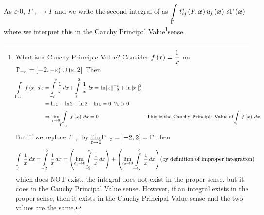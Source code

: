 As $\varepsilon^{\downarrow} 0$, $\Gamma_{-\varepsilon}\rightarrow \Gamma$ and
we write the second integral of  as $\gint{\Gamma}{}
{\fnof{t_{ij}^{*}}{P,\vect{x}}
  \fnof{u_{j}}{\vect{x}}}{\fnof{\Gamma}{\vect{x}}}$ where we interpret this in
the Cauchy Principal Value\footnote{What is a Cauchy Principle Value? 
                \newline Consider $ f\left( x \right)  = \dfrac{1}{x}$ on
    $\Gamma_{-\varepsilon} = \left[ -2,-\varepsilon) \cup (\varepsilon,2 \right]$
   \newline Then
      \begin{alignat*}{2}
          \displaystyle\int\limits_{\Gamma_{-\varepsilon}}^{} \, f\left( x \right) \,dx  &=
          \displaystyle\int\limits_{-2}^{-\varepsilon} \,\dfrac{1}{x}\,dx  +
          \displaystyle\int\limits_{\varepsilon}^{2} \,\dfrac{1}{x}\,dx  
        =  \left. \ln \left| x \right| \right|_{{-2}} ^{-\varepsilon} + 
           \left. \ln\left| x \right| \right|_{{\varepsilon}} ^{2} && \\ 
          &= \ln \varepsilon -\ln 2 + \ln 2
        - \ln \varepsilon=0 \;\;\forall \varepsilon>0 && \\ & \Rightarrow
        \displaystyle{\lim_{\varepsilon \rightarrow 0}}
          \displaystyle\int\limits_{\Gamma_{-\varepsilon}}^{} \, f\left( x \right) \,dx  = 0 && 
                                \text{This is the Cauchy Principle Value of}
                          \displaystyle\int\limits_{\Gamma}^{} \, f\left( x \right) \,dx 
      \end{alignat*}
   But if we replace $\Gamma_{-\varepsilon}$  by 
   $\displaystyle{\lim_{\varepsilon\rightarrow 0}}\Gamma_{-\varepsilon} = 
   \left[ -2,2 \right]  = \Gamma$ then 
   \begin{align*}
          \displaystyle\int\limits_{\Gamma}^{} \,\dfrac{1}{x}\,dx  =   \displaystyle\int\limits_{-2}^{2} \,\dfrac{1}{x}\,dx  = \left( \displaystyle{\lim_{\varepsilon_{1} 
              \rightarrow 0}}  \displaystyle\int\limits_{-2}^{\varepsilon_{1}} \,\dfrac{1}{x}\,dx  \right)  +
        \left( \displaystyle{\lim_{\varepsilon_{2} 
              \rightarrow 0}}  \displaystyle\int\limits_{-\varepsilon_{2}}^{2} \,\dfrac{1}{x}\,dx  \right)
        &\text{(by definition of improper integration)}
    \end{align*}
    \newline which does NOT exist. \ie the integral does not exist in the
    proper sense, but it does in the Cauchy Principal Value sense. However, if
    an integral exists in the proper sense, then it exists in the Cauchy
    Principal Value sense and the two values are the same.}sense. 

